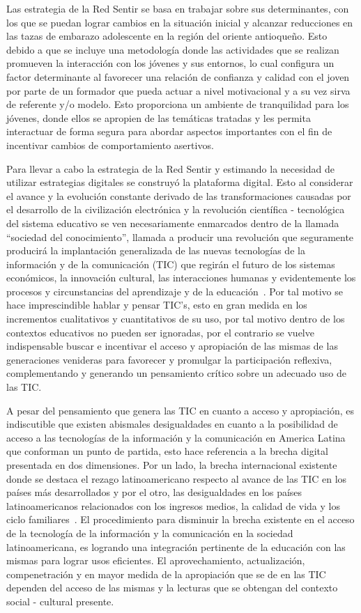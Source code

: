 \documentclass[a4paper]{article}
\begin{document}
Las estrategia de la Red Sentir se basa en trabajar sobre sus determinantes, con los que se puedan lograr cambios en la situación inicial y alcanzar reducciones en las tazas de embarazo adolescente en la región del oriente antioqueño. Esto debido a que se incluye una metodología donde las actividades que se realizan promueven la interacción con los jóvenes y sus entornos, lo cual configura un factor determinante al favorecer una relación de confianza y calidad con el joven por parte de un formador que pueda actuar a nivel motivacional y a su vez sirva de referente y/o modelo. Esto proporciona un ambiente de tranquilidad para los jóvenes, donde ellos se apropien de las temáticas tratadas y les permita interactuar de forma segura para abordar aspectos importantes con el fin de incentivar cambios de comportamiento asertivos.

Para llevar a cabo la estrategia de la Red Sentir y estimando la necesidad de utilizar estrategias digitales se construyó la plataforma digital. Esto al considerar el avance y la evolución constante derivado de las transformaciones causadas por el desarrollo de la civilización electrónica y la revolución científica - tecnológica del sistema educativo se ven necesariamente enmarcados dentro de la llamada ``sociedad del conocimiento'', llamada a producir una revolución que seguramente producirá la implantación generalizada de las nuevas tecnologías de la información y de la comunicación (TIC) que regirán el futuro de los sistemas económicos, la innovación cultural, las interacciones humanas y evidentemente los procesos y circunstancias del aprendizaje y de la educación~\citep{Asin2009}. Por tal motivo se hace imprescindible hablar y pensar TIC's, esto en gran medida en los incrementos cualitativos y cuantitativos de su uso, por tal motivo dentro de los contextos educativos no pueden ser ignoradas, por el contrario se vuelve indispensable buscar e incentivar el acceso y apropiación de las mismas de las generaciones venideras para favorecer y promulgar la participación reflexiva, complementando y generando un pensamiento crítico sobre un adecuado uso de las TIC. 

A pesar del pensamiento que genera las TIC en cuanto a acceso y apropiación, es indiscutible que existen abismales desigualdades en cuanto a la posibilidad de acceso a las tecnologías de la información y la comunicación en America Latina que conforman un punto de partida, esto hace referencia a la brecha digital presentada en dos dimensiones. Por un lado, la brecha internacional existente donde se destaca el rezago latinoamericano respecto al avance de las TIC en los países más desarrollados y por el otro, las desigualdades en los países latinoamericanos relacionados con los ingresos medios, la calidad de vida y los ciclo familiares~\citep{Sunkel2006}. El procedimiento para disminuir la brecha existente en el acceso de la tecnología de la información y la comunicación en la sociedad latinoamericana, es logrando una integración pertinente de la educación con las mismas para lograr usos eficientes. El aprovechamiento, actualización, compenetración y en mayor medida de la apropiación que se de en las TIC dependen del acceso de las mismas y la lecturas que se obtengan del contexto social - cultural presente.
\end{document}
